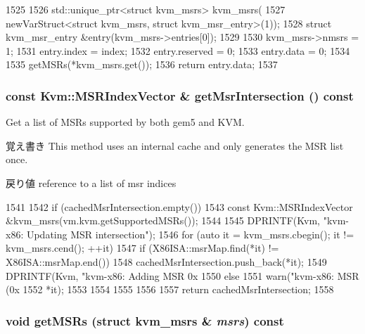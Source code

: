 \begin{DoxyCode}
1525 {
1526     std::unique_ptr<struct kvm_msrs> kvm_msrs(
1527         newVarStruct<struct kvm_msrs, struct kvm_msr_entry>(1));
1528     struct kvm_msr_entry &entry(kvm_msrs->entries[0]);
1529 
1530     kvm_msrs->nmsrs = 1;
1531     entry.index = index;
1532     entry.reserved = 0;
1533     entry.data = 0;
1534 
1535     getMSRs(*kvm_msrs.get());
1536     return entry.data;
1537 }
\end{DoxyCode}
\hypertarget{classX86KvmCPU_abab51da6ec6a0f14d2dde6b0857b7b34}{
\subsubsection[{getMsrIntersection}]{\setlength{\rightskip}{0pt plus 5cm}const {\bf Kvm::MSRIndexVector} \& getMsrIntersection () const}}
\label{classX86KvmCPU_abab51da6ec6a0f14d2dde6b0857b7b34}
Get a list of MSRs supported by both gem5 and KVM.

\begin{DoxyNote}{覚え書き}
This method uses an internal cache and only generates the MSR list once.
\end{DoxyNote}
\begin{DoxyReturn}{戻り値}
reference to a list of msr indices 
\end{DoxyReturn}



\begin{DoxyCode}
1541 {
1542     if (cachedMsrIntersection.empty()) {
1543         const Kvm::MSRIndexVector &kvm_msrs(vm.kvm.getSupportedMSRs());
1544 
1545         DPRINTF(Kvm, "kvm-x86: Updating MSR intersection\n");
1546         for (auto it = kvm_msrs.cbegin(); it != kvm_msrs.cend(); ++it) {
1547             if (X86ISA::msrMap.find(*it) != X86ISA::msrMap.end()) {
1548                 cachedMsrIntersection.push_back(*it);
1549                 DPRINTF(Kvm, "kvm-x86: Adding MSR 0x%
1550             } else {
1551                 warn("kvm-x86: MSR (0x%
1552                      *it);
1553             }
1554         }
1555     }
1556 
1557     return cachedMsrIntersection;
1558 }
\end{DoxyCode}
\hypertarget{classX86KvmCPU_aee0c514e035c18531c33ea1219e621bf}{
\subsubsection[{getMSRs}]{\setlength{\rightskip}{0pt plus 5cm}void getMSRs (struct kvm\_\-msrs \& {\em msrs}) const}}
\label{classX86KvmCPU_aee0c514e035c18531c33ea1219e621bf}



